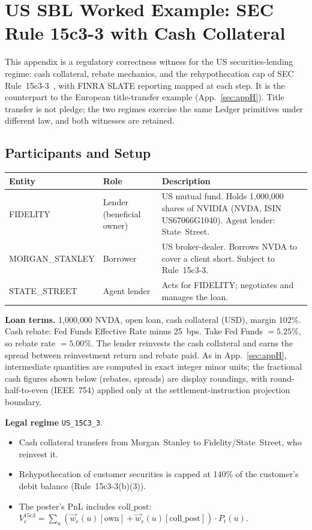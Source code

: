 \section{US SBL Worked Example: SEC Rule 15c3-3 with Cash Collateral}
\label{sec:appI}
\label{app:us-sbl-example}

This appendix is a regulatory correctness witness for the US securities-lending regime: cash collateral, rebate mechanics, and the rehypothecation cap of SEC Rule~15c3-3~\cite{sec15c33}, with FINRA SLATE reporting mapped at each step. It is the counterpart to the European title-transfer example (App.~\ref{sec:appH}). Title transfer is not pledge; the two regimes exercise the same Ledger primitives under different law, and both witnesses are retained.

\subsection{Participants and Setup}

\begin{center}\small
\begin{tabular}{l l p{7.5cm}}
\toprule
\textbf{Entity} & \textbf{Role} & \textbf{Description} \\
\midrule
FIDELITY & Lender (beneficial owner) & US mutual fund. Holds 1{,}000{,}000 shares of NVIDIA (NVDA, ISIN US67066G1040). Agent lender: State~Street. \\
MORGAN\_STANLEY & Borrower & US broker-dealer. Borrows NVDA to cover a client short. Subject to Rule~15c3-3. \\
STATE\_STREET & Agent lender & Acts for FIDELITY; negotiates and manages the loan. \\
\bottomrule
\end{tabular}
\end{center}

\noindent\textbf{Loan terms.} 1{,}000{,}000 NVDA, open loan, cash collateral (USD), margin 102\%. Cash rebate: Fed Funds Effective Rate minus 25~bps. Take Fed Funds $= 5.25\%$, so rebate rate $= 5.00\%$. The lender reinvests the cash collateral and earns the spread between reinvestment return and rebate paid. As in App.~\ref{sec:appH}, intermediate quantities are computed in exact integer minor units; the fractional cash figures shown below (rebates, spreads) are display roundings, with round-half-to-even (IEEE~754) applied only at the settlement-instruction projection boundary.

\medskip
\noindent\textbf{Legal regime} \texttt{US\_15C3\_3}.
\begin{itemize}[nosep]
\item Cash collateral transfers from Morgan~Stanley to Fidelity/State~Street, who reinvest it.
\item Rehypothecation of customer securities is capped at 140\% of the customer's debit balance (Rule~15c3-3(b)(3)).
\item The poster's PnL includes $\mathrm{coll\_post}$: $V_e^{\mathrm{15c3}} = \sum_u (\vec{w}_e(u)[\mathrm{own}] + \vec{w}_e(u)[\mathrm{coll\_post}]) \cdot P_t(u)$.
\end{itemize}

